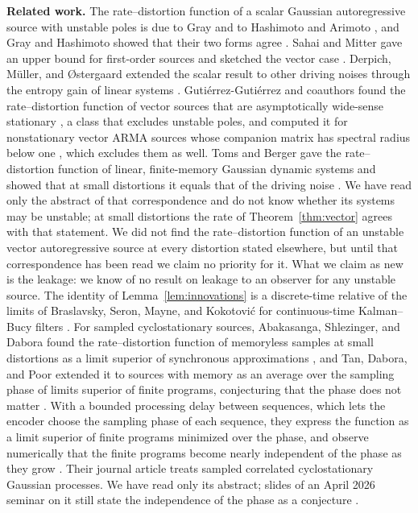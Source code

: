 \documentclass[11pt,onecolumn]{IEEEtran}
\begin{document}
\textbf{Related work.} The rate--distortion function of a scalar
Gaussian autoregressive source with unstable poles is due to Gray
\cite{gray1970} and to Hashimoto and Arimoto \cite{hashimoto1980}, and
Gray and Hashimoto showed that their two forms agree
\cite{grayhashimoto2008}. Sahai and Mitter gave an upper bound for
first-order sources and sketched the vector case
\cite{sahai2007}. Derpich, M\"uller, and \O stergaard extended the scalar
result to other driving noises through the entropy gain of linear
systems \cite{derpich2021}. Guti\'errez-Guti\'errez and coauthors found
the rate--distortion function of vector sources that are asymptotically
wide-sense stationary \cite{gutierrez2018}, a class that excludes
unstable poles, and computed it for nonstationary vector ARMA sources
whose companion matrix has spectral radius below one
\cite[Theorem~4]{gutierrez2024}, which excludes them as well. Toms and
Berger gave the rate--distortion function of linear, finite-memory
Gaussian dynamic systems and showed that at small distortions it equals
that of the driving noise \cite{toms1971}. We have read only the
abstract of that correspondence and do not know whether its systems may
be unstable; at small distortions the rate of Theorem~\ref{thm:vector}
agrees with that statement. We did not find the rate--distortion
function of an unstable vector autoregressive source at every distortion
stated elsewhere, but until that correspondence has been read we claim
no priority for it. What we claim as new is the leakage: we know of no
result on leakage to an observer for any unstable source. The identity of
Lemma~\ref{lem:innovations} is a discrete-time relative of the limits
of Braslavsky, Seron, Mayne, and Kokotovi\'c for continuous-time
Kalman--Bucy filters \cite{braslavsky1999}. For sampled cyclostationary
sources, Abakasanga, Shlezinger, and Dabora found the rate--distortion
function of memoryless samples at small distortions as a limit
superior of synchronous approximations \cite{abakasanga2020}, and Tan,
Dabora, and Poor extended it to sources with memory as an average over
the sampling phase of limits superior of finite programs, conjecturing
that the phase does not matter \cite{tan2024}. With a bounded processing
delay between sequences, which lets the encoder choose the sampling
phase of each sequence, they express the function as a limit superior
of finite programs minimized over the phase, and observe numerically
that the finite programs become nearly independent of the phase as they
grow \cite{tan2025}. Their journal article \cite{tan2026} treats sampled
correlated cyclostationary Gaussian processes. We have read only its
abstract; slides of an April 2026 seminar on it still state the
independence of the phase as a conjecture \cite{tan2026slides}.
\end{document}
